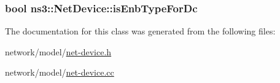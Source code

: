 \subsubsection[{\texorpdfstring{is\+Enb\+Type\+For\+Dc}{isEnbTypeForDc}}]{\setlength{\rightskip}{0pt plus 5cm}bool ns3\+::\+Net\+Device\+::is\+Enb\+Type\+For\+Dc}\hypertarget{classns3_1_1NetDevice_a3427aa98959cb2437e97a51fa50d93eb}{}\label{classns3_1_1NetDevice_a3427aa98959cb2437e97a51fa50d93eb}


The documentation for this class was generated from the following files\+:\begin{DoxyCompactItemize}
\item 
network/model/\hyperlink{net-device_8h}{net-\/device.\+h}\item 
network/model/\hyperlink{net-device_8cc}{net-\/device.\+cc}\end{DoxyCompactItemize}
